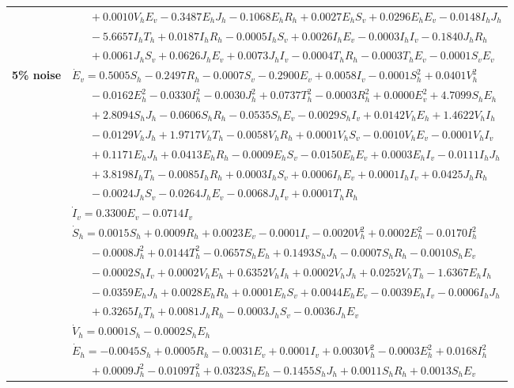 \documentclass[9pt]{article}
\numberwithin{equation}{section}
\begin{document}
\begin{table}[ht]
    \begin{tabularx}{1\linewidth}{|l|X|}
        & $\quad\;\;+0.0010V_hE_v-0.3487E_hJ_h-0.1068E_hR_h+0.0027E_hS_v+0.0296E_hE_v-0.0148I_hJ_h$ \\
        & $\quad\;\;-5.6657I_hT_h+0.0187I_hR_h-0.0005I_hS_v+0.0026I_hE_v-0.0003I_hI_v-0.1840J_hR_h$ \\
        & $\quad\;\;+0.0061J_hS_v+0.0626J_hE_v+0.0073J_hI_v-0.0004T_hR_h-0.0003T_hE_v-0.0001S_vE_v$ \\
        \textbf{5\% noise} & $\dot{E}_v=0.5005S_h-0.2497R_h-0.0007S_v-0.2900E_v+0.0058I_v-0.0001S_h^2+0.0401V_h^2$ \\
        & $\quad\;\;-0.0162E_h^2-0.0330I_h^2-0.0030J_h^2+0.0737T_h^2-0.0003R_h^2+0.0000E_v^2+4.7099S_hE_h$ \\
        & $\quad\;\;+2.8094S_hJ_h-0.0606S_hR_h-0.0535S_hE_v-0.0029S_hI_v+0.0142V_hE_h+1.4622V_hI_h$ \\
        & $\quad\;\;-0.0129V_hJ_h+1.9717V_hT_h-0.0058V_hR_h+0.0001V_hS_v-0.0010V_hE_v-0.0001V_hI_v$ \\
        & $\quad\;\;+0.1171E_hJ_h+0.0413E_hR_h-0.0009E_hS_v-0.0150E_hE_v+0.0003E_hI_v-0.0111I_hJ_h$ \\
        & $\quad\;\;+3.8198I_hT_h-0.0085I_hR_h+0.0003I_hS_v+0.0006I_hE_v+0.0001I_hI_v+0.0425J_hR_h$ \\
        & $\quad\;\;-0.0024J_hS_v-0.0264J_hE_v-0.0068J_hI_v+0.0001T_hR_h$ \\
        & $\dot{I}_v=0.3300E_v-0.0714I_v$ \\
        \hline\hline 
        & $\dot{S}_h=0.0015S_h+0.0009R_h+0.0023E_v-0.0001I_v-0.0020V_h^2+0.0002E_h^2-0.0170I_h^2$ \\
        & $\quad\;\;-0.0008J_h^2+0.0144T_h^2-0.0657S_hE_h+0.1493S_hJ_h-0.0007S_hR_h-0.0010S_hE_v$ \\
        & $\quad\;\;-0.0002S_hI_v+0.0002V_hE_h+0.6352V_hI_h+0.0002V_hJ_h+0.0252V_hT_h-1.6367E_hI_h$ \\
        & $\quad\;\;-0.0359E_hJ_h+0.0028E_hR_h+0.0001E_hS_v+0.0044E_hE_v-0.0039E_hI_v-0.0006I_hJ_h$ \\
        & $\quad\;\;+0.3265I_hT_h+0.0081J_hR_h-0.0003J_hS_v-0.0036J_hE_v$ \\
        & $\dot{V}_h=0.0001S_h-0.0002S_hE_h$ \\
        & $\dot{E}_h=-0.0045S_h+0.0005R_h-0.0031E_v+0.0001I_v+0.0030V_h^2-0.0003E_h^2+0.0168I_h^2$ \\
        & $\quad\;\;+0.0009J_h^2-0.0109T_h^2+0.0323S_hE_h-0.1455S_hJ_h+0.0011S_hR_h+0.0013S_hE_v$ \\

\end{tabularx}
\end{table}
\end{document}

